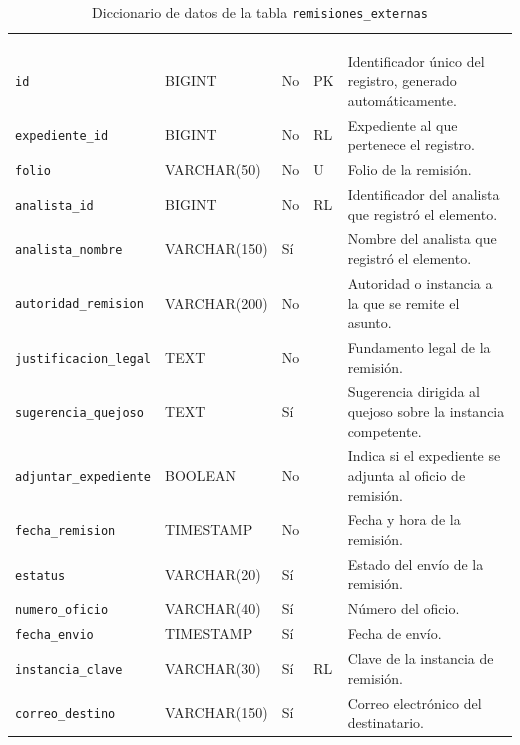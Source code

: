 \footnotesize
\renewcommand{\arraystretch}{1.15}
\setlength{\tabcolsep}{4pt}
\begin{longtable}{|L{3.9cm}|L{2.4cm}|L{0.9cm}|L{1.2cm}|L{6.6cm}|}
	\hiderowcolors\caption{Diccionario de datos de la tabla \texttt{remisiones\_externas}}
	\label{tab:dic_remisiones_externas} \\ \showrowcolors
	\hline
	 &  &  &  &  \\
	\hline
	\endfirsthead
	\hline
	 &  &  &  &  \\
	\hline
	\endhead
		\texttt{id} & BIGINT & No & PK & Identificador único del registro, generado automáticamente. \\ \hline
		\texttt{expediente\_\allowbreak{}id} & BIGINT & No & RL & Expediente al que pertenece el registro. \\ \hline
		\texttt{folio} & VARCHAR(50) & No & U & Folio de la remisión. \\ \hline
		\texttt{analista\_\allowbreak{}id} & BIGINT & No & RL & Identificador del analista que registró el elemento. \\ \hline
		\texttt{analista\_\allowbreak{}nombre} & VARCHAR(150) & Sí &  & Nombre del analista que registró el elemento. \\ \hline
		\texttt{autoridad\_\allowbreak{}remision} & VARCHAR(200) & No &  & Autoridad o instancia a la que se remite el asunto. \\ \hline
		\texttt{justificacion\_\allowbreak{}legal} & TEXT & No &  & Fundamento legal de la remisión. \\ \hline
		\texttt{sugerencia\_\allowbreak{}quejoso} & TEXT & Sí &  & Sugerencia dirigida al quejoso sobre la instancia competente. \\ \hline
		\texttt{adjuntar\_\allowbreak{}expediente} & BOOLEAN & No &  & Indica si el expediente se adjunta al oficio de remisión. \\ \hline
		\texttt{fecha\_\allowbreak{}remision} & TIMESTAMP & No &  & Fecha y hora de la remisión. \\ \hline
		\texttt{estatus} & VARCHAR(20) & Sí &  & Estado del envío de la remisión. \\ \hline
		\texttt{numero\_\allowbreak{}oficio} & VARCHAR(40) & Sí &  & Número del oficio. \\ \hline
		\texttt{fecha\_\allowbreak{}envio} & TIMESTAMP & Sí &  & Fecha de envío. \\ \hline
		\texttt{instancia\_\allowbreak{}clave} & VARCHAR(30) & Sí & RL & Clave de la instancia de remisión. \\ \hline
		\texttt{correo\_\allowbreak{}destino} & VARCHAR(150) & Sí &  & Correo electrónico del destinatario. \\ \hline
\end{longtable}
\normalsize
\setlength{\tabcolsep}{6pt}
\renewcommand{\arraystretch}{1}

